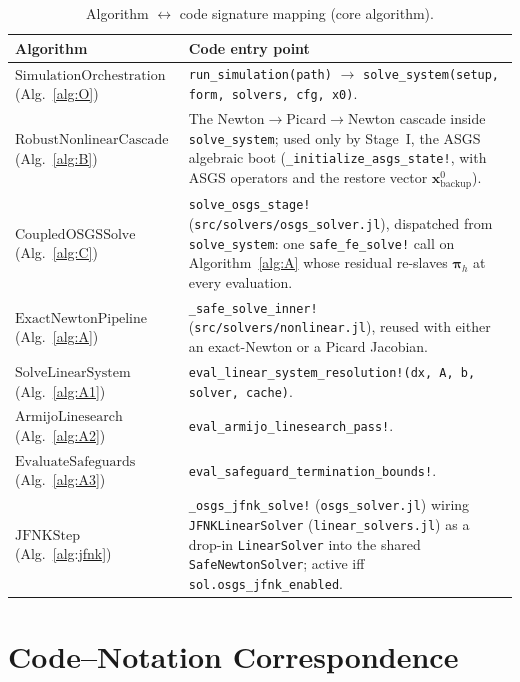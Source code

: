 \documentclass{article}
\newcommand{\code}[1]{\texttt{\small #1}}
\begin{document}
\begin{table}[h]
\centering
\caption{Algorithm $\leftrightarrow$ code signature mapping (core algorithm).}
\label{tab:functions}
\small
\begin{tabularx}{\textwidth}{@{} l X @{}}
\toprule
\textbf{Algorithm} & \textbf{Code entry point} \\
\midrule
$\mathrm{SimulationOrchestration}$ (Alg.~\ref{alg:O})   & \code{run\_simulation(path)} $\to$ \code{solve\_system(setup, form, solvers, cfg, x0)}. \\
$\mathrm{RobustNonlinearCascade}$ (Alg.~\ref{alg:B})    & The Newton$\to$Picard$\to$Newton cascade inside \code{solve\_system}; used only by Stage~I, the ASGS algebraic boot (\code{\_initialize\_asgs\_state!}, with ASGS operators and the restore vector $\boldsymbol{x}^0_{\mathrm{backup}}$). \\
$\mathrm{CoupledOSGSSolve}$ (Alg.~\ref{alg:C})  & \code{solve\_osgs\_stage!} (\code{src/solvers/osgs\_solver.jl}), dispatched from \code{solve\_system}: one \code{safe\_fe\_solve!} call on Algorithm~\ref{alg:A} whose residual re-slaves $\boldsymbol{\pi}_h$ at every evaluation. \\
$\mathrm{ExactNewtonPipeline}$ (Alg.~\ref{alg:A})       & \code{\_safe\_solve\_inner!} (\code{src/solvers/nonlinear.jl}), reused with either an exact-Newton or a Picard Jacobian. \\
$\mathrm{SolveLinearSystem}$ (Alg.~\ref{alg:A1})        & \code{eval\_linear\_system\_resolution!(dx, A, b, solver, cache)}. \\
$\mathrm{ArmijoLinesearch}$ (Alg.~\ref{alg:A2})         & \code{eval\_armijo\_linesearch\_pass!}. \\
$\mathrm{EvaluateSafeguards}$ (Alg.~\ref{alg:A3})       & \code{eval\_safeguard\_termination\_bounds!}. \\
$\mathrm{JFNKStep}$ (Alg.~\ref{alg:jfnk})               & \code{\_osgs\_jfnk\_solve!} (\code{osgs\_solver.jl}) wiring \code{JFNKLinearSolver} (\code{linear\_solvers.jl}) as a drop-in \code{LinearSolver} into the shared \code{SafeNewtonSolver}; active iff \code{sol.osgs\_jfnk\_enabled}. \\
\bottomrule
\end{tabularx}
\end{table}

\appendix
\section{Code--Notation Correspondence}
\label{sec:appendix-codes}
\end{document}
